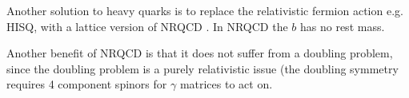     Another solution to heavy quarks is to replace the relativistic fermion action e.g. HISQ, with a lattice version of NRQCD \cite{Lepage:1992tx}. In NRQCD the $b$ has no rest mass.



    Another benefit of NRQCD is that it does not suffer from a doubling problem, since the doubling problem is a purely relativistic issue (the doubling symmetry requires 4 component spinors for $\gamma$ matrices to act on.

